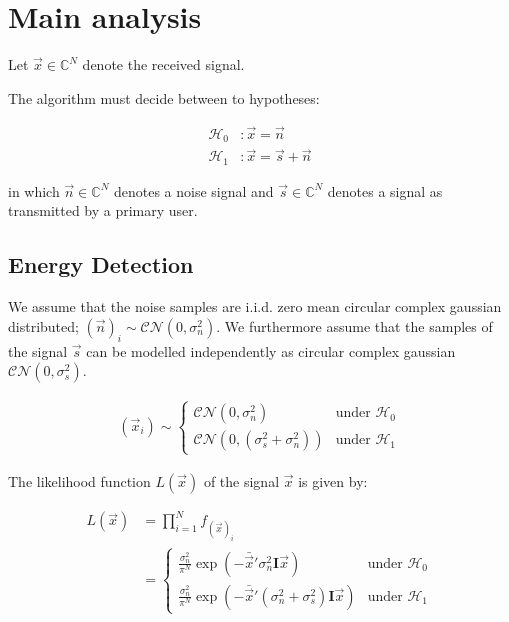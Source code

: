 \documentclass[a4paper, openany, oneside]{memoir}
\begin{document}
\section{Main analysis}

Let $\vec{x} \in \mathbb{C}^{N}$ denote the received signal. 

The algorithm must decide between to hypotheses:

\begin{align}\label{eq:hypotheses}
  \mathcal{H}_0&: \vec{x} = \vec{n}\\
  \mathcal{H}_1&: \vec{x} = \vec{s} + \vec{n}
\end{align}

in which $\vec{n} \in \mathbb{C}^{N} $ denotes a noise signal and $\vec{s} \in \mathbb{C}^{N}$ denotes a signal as transmitted by a primary user.

\subsection{Energy Detection}
We assume that the noise samples are i.i.d. zero mean circular complex gaussian distributed; $(\vec{n})_i \sim \mathcal{CN}(0, \sigma_n^2)$. 
We furthermore assume that the samples of the signal $\vec{s}$ can be modelled independently as circular complex gaussian $\mathcal{CN}(0, \sigma_s^2)$. %

\begin{align*}
(\vec{x}_i) \sim 
    \begin{cases}
        \mathcal{CN}(0, \sigma_n^2) & \text{under $\mathcal{H}_0$} \\
        \mathcal{CN}(0, (\sigma_s^2 + \sigma_n^2)) & \text{under $\mathcal{H}_1$}
    \end{cases}
\end{align*} 

The likelihood function $L(\vec{x})$ of the signal $\vec{x}$ is given by:

\begin{align*}
    L(\vec{x}) &= \prod_{i=1}^N f_{(\vec{x})_i}\\
    &= \begin{cases}
        \frac{\sigma_n^2}{\pi^N } \exp(-\bar{\vec{x}}'\sigma_n^2\mathbf{I}\vec{x}) & \text{under $\mathcal{H}_0$} \\
        \frac{\sigma_n^2}{\pi^N } \exp(-\bar{\vec{x}}'(\sigma_n^2+\sigma_s^2)\mathbf{I}\vec{x}) & \text{under $\mathcal{H}_1$}
    \end{cases}
\end{align*}
\end{document}
